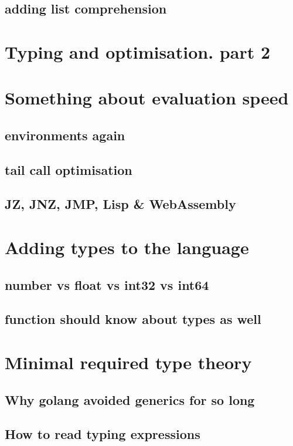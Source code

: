 \documentclass[11pt]{article}
\begin{document}
\subsection{adding list comprehension}
\label{sec:orgc0a7f22}
\section{Typing and optimisation. part 2}
\label{sec:org9e06e53}
\section{Something about evaluation speed}
\label{sec:org1d8b880}

\subsection{environments again}
\label{sec:orgb79f5f3}
\subsection{tail call optimisation}
\label{sec:org266cf65}
\subsection{JZ, JNZ, JMP, Lisp \& WebAssembly}
\label{sec:orgc8179d0}
\section{Adding types to the language}
\label{sec:org9b73bb5}
\subsection{number vs float vs int32 vs int64}
\label{sec:orgc6ab3de}
\subsection{function should know about types as well}
\label{sec:orgabc5eb0}
\section{Minimal required type theory}
\label{sec:orgad0b8db}
\subsection{Why golang avoided generics for so long}
\label{sec:org5d764f7}
\subsection{How to read typing expressions}
\label{sec:orgd53eb0d}
\end{document}
